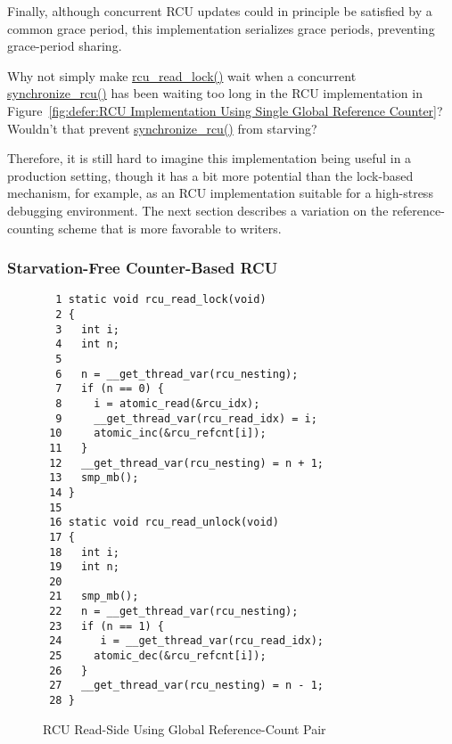 Finally, although concurrent RCU updates could in principle be
satisfied by a common grace period, this implementation
serializes grace periods, preventing grace-period
sharing.

\QuickQuiz{}
	Why not simply make \url{rcu_read_lock()} wait when a concurrent
	\url{synchronize_rcu()} has been waiting too long in
	the RCU implementation in
	Figure~\ref{fig:defer:RCU Implementation Using Single Global Reference Counter}?
	Wouldn't that prevent \url{synchronize_rcu()} from starving?
 \QuickQuizEnd

Therefore, it is still hard to imagine this implementation being useful
in a production setting, though it has a bit more potential
than the lock-based mechanism, for example, as an RCU implementation
suitable for a high-stress debugging environment.
The next section describes a variation on the reference-counting
scheme that is more favorable to writers.

\subsubsection{Starvation-Free Counter-Based RCU}
\label{defer:Starvation-Free Counter-Based RCU}

\begin{figure}[tbp]
{ \scriptsize
\begin{verbatim}
  1 static void rcu_read_lock(void)
  2 {
  3   int i;
  4   int n;
  5
  6   n = __get_thread_var(rcu_nesting);
  7   if (n == 0) {
  8     i = atomic_read(&rcu_idx);
  9     __get_thread_var(rcu_read_idx) = i;
 10     atomic_inc(&rcu_refcnt[i]);
 11   }
 12   __get_thread_var(rcu_nesting) = n + 1;
 13   smp_mb();
 14 }
 15
 16 static void rcu_read_unlock(void)
 17 {
 18   int i;
 19   int n;
 20
 21   smp_mb();
 22   n = __get_thread_var(rcu_nesting);
 23   if (n == 1) {
 24      i = __get_thread_var(rcu_read_idx);
 25     atomic_dec(&rcu_refcnt[i]);
 26   }
 27   __get_thread_var(rcu_nesting) = n - 1;
 28 }
\end{verbatim}
}
\caption{RCU Read-Side Using Global Reference-Count Pair}
\label{fig:defer:RCU Read-Side Using Global Reference-Count Pair}
\end{figure}

